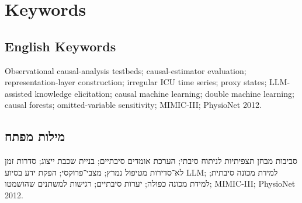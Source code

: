 \chapter*{Keywords}

\section*{English Keywords}
Observational causal-analysis testbeds; causal-estimator evaluation; representation-layer construction; irregular ICU time series; proxy states; LLM-assisted knowledge elicitation; causal machine learning; double machine learning; causal forests; omitted-variable sensitivity; MIMIC-III; PhysioNet 2012.

\begin{hebrew}
\begingroup
\let\raggedright\raggedleft
\section*{מילות מפתח}
\endgroup
סביבות מבחן תצפיתיות לניתוח סיבתי; הערכת אומדים סיבתיים; בניית שכבת ייצוג; סדרות זמן לא־סדירות מטיפול נמרץ; מצבי־פרוקסי; הפקת ידע בסיוע \textenglish{LLM}; למידת מכונה סיבתית; למידת מכונה כפולה; יערות סיבתיים; רגישות למשתנים שהושמטו; \textenglish{MIMIC-III}; \textenglish{PhysioNet 2012}.
\end{hebrew}

